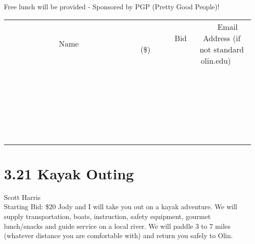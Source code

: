 \documentclass[11pt]{article}
\begin{document}
Free lunch will be provided - Sponsored by PGP (Pretty Good People)!
\\[6ex]
\begin{tabular}{c c c}
~~~~~~~~~~~~~Name~~~~~~~~~~~~~ & ~~~~~~~~~Bid (\$)~~~~~~~~~  & ~~~Email Address (if not standard olin.edu)~~~\\
 & & \\
\hline
 & & \\
\hline
 & & \\
\hline
 & & \\
\hline
 & & \\
\hline
 & & \\
\hline
 & & \\
\hline
 & & \\
\hline
 & & \\
\hline
 & & \\
\hline
 & & \\
\hline
 & & \\
\hline
 & & \\
\hline
 & & \\
\hline
 & & \\
\hline
 & & \\
\hline
 & & \\
\hline
 & & \\
\hline
 & & \\
\hline
 & & \\
\hline
 & & \\
\hline
 & & \\
\hline
 & & \\
\hline
 & & \\
\hline
 & & \\
\hline
 & & \\
\hline
\end{tabular}
\newpage
\section*{3.21 Kayak Outing}
Scott Harris
\\
Starting Bid: \$20
\newline
Jody and I will take you out on a kayak adventure. We will supply transportation, boats, instruction, safety equipment, gourmet lunch/snacks and guide service on a local river. We will paddle 3 to 7 miles (whatever distance you are comfortable with) and return you safely to Olin.
\end{document}
